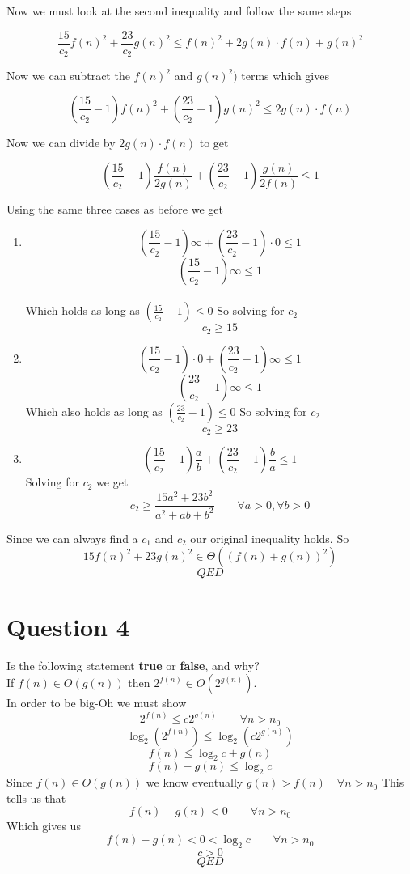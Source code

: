 \documentclass{article}
\begin{document}
Now we must look at the second inequality and follow the same steps

$$\frac{15}{c_{2}}f(n)^2+\frac{23}{c_{2}}g(n)^2 \leq f(n)^2+2g(n) \cdot f(n) + g(n)^2$$

Now we can subtract the $f(n)^2$ and $g(n)^2)$ terms which gives

$$(\frac{15}{c_{2}}-1)f(n)^2+(\frac{23}{c_{2}}-1)g(n)^2 \leq 2g(n) \cdot f(n)$$

Now we can divide by $2g(n) \cdot f(n)$ to get

$$(\frac{15}{c_{2}}-1)\frac{f(n)}{2g(n)}+(\frac{23}{c_{2}}-1)\frac{g(n)}{2f(n)} \leq 1$$

Using the same three cases as before we get

\begin{enumerate}

\item $$(\frac{15}{c_{2}}-1) \infty + (\frac{23}{c_{2}}-1)\cdot 0 \leq 1$$
$$(\frac{15}{c_{2}}-1) \infty \leq 1$$ \\
Which holds as long as $(\frac{15}{c_{2}}-1) \leq 0$ So solving for $c_{2}$
$$c_{2} \geq 15$$

\item $$(\frac{15}{c_{2}}-1)\cdot 0  + (\frac{23}{c_{2}}-1)\infty \leq 1$$
$$(\frac{23}{c_{2}}-1)\infty \leq 1$$
Which also holds as long as $(\frac{23}{c_{2}}-1) \leq 0$ So solving for $c_{2}$
$$c_{2} \geq 23$$

\item $$(\frac{15}{c_{2}}-1)\frac{a}{b}  + (\frac{23}{c_{2}}-1)\frac{b}{a} \leq 1$$
Solving for $c_{2}$ we get
$$c_{2} \geq \frac{15a^2+23b^2}{a^2+ab+b^2}\qquad \forall a>0, \forall b>0$$

\end{enumerate}

Since we can always find a $c_{1}$ and $c_{2}$ our original inequality holds. So
$$15f(n)^2+23g(n)^2 \in \Theta((f(n)+g(n))^2)$$
$$QED$$

\section*{Question 4}
Is the following statement {\bf true} or {\bf false}, and why? \\
If $f(n) \in O(g(n))$ then $2^{f(n)} \in O(2^{g(n)})$. \\
In order to be big-Oh we must show
$$2^{f(n)} \leq c2^{g(n)}\qquad \forall n>n_{0}$$
$$\log_{2}(2^{f(n)}) \leq \log_{2}(c2^{g(n)})$$
$$f(n) \leq \log_{2}c + g(n)$$
$$f(n) - g(n) \leq \log_{2}c $$
Since $f(n) \in O(g(n))$ we know eventually $g(n) > f(n)\quad \forall n>n_{0}$
This tells us that
$$f(n)-g(n) < 0\qquad \forall n>n_{0}$$
Which gives us
$$f(n)-g(n)<0<\log_{2}c\qquad \forall n>n_{0}$$
$$c>0$$
$$QED$$
\end{document}
